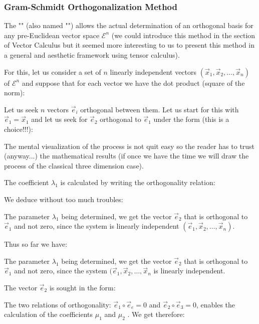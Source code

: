 	\subsubsection{Gram-Schmidt Orthogonalization Method}
	The "\label{gram-schmidt procedure}" (also named "") allows the actual determination of an orthogonal basis for any pre-Euclidean vector space $\mathcal{E}^n$ (we could introduce this method in the section of Vector Calculus but it seemed more interesting to us to present this method in a general and aesthetic framework using tensor calculus).
	
	For this, let us consider a set of $n$ linearly independent vectors $(\vec{x}_1,\vec{x}_2,\ldots,\vec{x}_n)$ of $\mathcal{E}^n$ and suppose that for each vector we have the dot product (square of the norm):
	
	Let us seek $n$ vectors $\vec{e}_i$ orthogonal between them. Let us start for this with $\vec{e}_1=\vec{x}_1$ and let us seek for $\vec{e}_2$ orthogonal to $\vec{e}_1$ under the form (this is a choice!!!):
	
	The mental visualization of the process is not quit easy so the reader has to trust (anyway...) the mathematical results (if once we have the time we will draw the process of the classical three dimension case).
	
	The coefficient $\lambda_1$ is calculated by writing the orthogonality relation:
	
	We deduce without too much troubles:
	
	The parameter $\lambda_1$ being determined, we get the vector $\vec{e}_2$ that is orthogonal to $\vec{e}_1$ and not zero, since the system is linearly independent $(\vec{e}_1,\vec{x}_2,\ldots,\vec{x}_n)$.
	
	Thus so far we have:
	
	The parameter $\lambda_1$ being determined, we get the vector $\vec{e}_2$ that is orthogonal to $\vec{e}_1$ and not zero, since the system $(\vec{e}_1,\vec{x}_2,\ldots,\vec{x}_n$ is linearly independent.
	
	The vector $\vec{e}_2$ is sought in the form:
	
	The two relations of orthogonality: $\vec{e}_1\circ\vec{e}_e=0$ and $\vec{e}_2\circ\vec{e}_3=0$, enables the calculation of the coefficients $\mu_1$ and $\mu_2$ . We get therefore:
	
